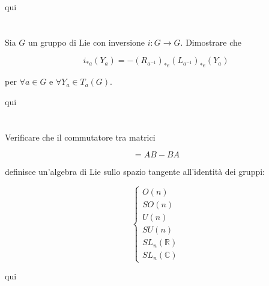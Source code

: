 qui

\tocless\section{}\label{es3-8}

\begin{tcolorbox}
		Sia $ G $ un gruppo di Lie con inversione $ i : G \to G $. Dimostrare che
	
	\begin{equation}
		i_{*a}(Y_{a}) = -(R_{a^{-1}})_{*e}(L_{a^{-1}})_{*e} (Y_{a})
	\end{equation}
	
	per $ \forall a \in G $ e $ \forall Y_{a} \in T_{a}(G) $.
\end{tcolorbox}

qui

\tocless\section{}\label{es3-9}

\begin{tcolorbox}
	Verificare che il commutatore tra matrici
	
	\begin{equation}
		[A,B] = AB - BA
	\end{equation}

	definisce un'algebra di Lie sullo spazio tangente all'identità dei gruppi:
	
	\begin{equation}
		\begin{cases}
			O(n)\\
			SO(n)\\
			U(n)\\
			SU(n)\\
			SL_{n}(\mathbb{R})\\
			SL_{n}(\mathbb{C})
		\end{cases}
	\end{equation}
\end{tcolorbox}

qui

\tocless\section{}\label{es3-10}

